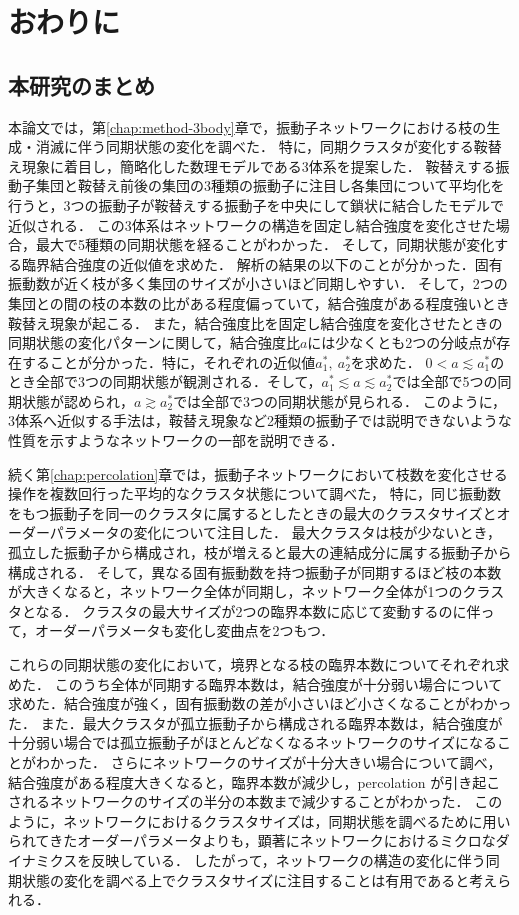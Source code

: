 \documentclass[../main]{subfiles}
\begin{document}
\chapter{おわりに}
\label{chap:summary}
\section{本研究のまとめ}
本論文では，第\ref{chap:method-3body}章で，振動子ネットワークにおける枝の生成・消滅に伴う同期状態の変化を調べた．
特に，同期クラスタが変化する鞍替え現象に着目し，簡略化した数理モデルである3体系を提案した．
鞍替えする振動子集団と鞍替え前後の集団の3種類の振動子に注目し各集団について平均化を行うと，3つの振動子が鞍替えする振動子を中央にして鎖状に結合したモデルで近似される．
この3体系はネットワークの構造を固定し結合強度を変化させた場合，最大で5種類の同期状態を経ることがわかった．
そして，同期状態が変化する臨界結合強度の近似値を求めた．
解析の結果の以下のことが分かった．固有振動数が近く枝が多く集団のサイズが小さいほど同期しやすい．
そして，2つの集団との間の枝の本数の比がある程度偏っていて，結合強度がある程度強いとき鞍替え現象が起こる．
また，結合強度比を固定し結合強度を変化させたときの同期状態の変化パターンに関して，結合強度比$a$には少なくとも2つの分岐点が存在することが分かった．特に，それぞれの近似値$a^\ast_1,\ a^\ast_2$を求めた．
$0<a\lesssim a^\ast_1$のとき全部で3つの同期状態が観測される．そして，$a^\ast_1\lesssim a\lesssim a^\ast_2$では全部で5つの同期状態が認められ，$a\gtrsim a^\ast_2$では全部で3つの同期状態が見られる．
このように，3体系へ近似する手法は，鞍替え現象など2種類の振動子では説明できないような性質を示すようなネットワークの一部を説明できる．

続く第\ref{chap:percolation}章では，振動子ネットワークにおいて枝数を変化させる操作を複数回行った平均的なクラスタ状態について調べた，
特に，同じ振動数をもつ振動子を同一のクラスタに属するとしたときの最大のクラスタサイズとオーダーパラメータの変化について注目した．
最大クラスタは枝が少ないとき，孤立した振動子から構成され，枝が増えると最大の連結成分に属する振動子から構成される．
そして，異なる固有振動数を持つ振動子が同期するほど枝の本数が大きくなると，ネットワーク全体が同期し，ネットワーク全体が1つのクラスタとなる．
クラスタの最大サイズが2つの臨界本数に応じて変動するのに伴って，オーダーパラメータも変化し変曲点を2つもつ．

これらの同期状態の変化において，境界となる枝の臨界本数についてそれぞれ求めた．
このうち全体が同期する臨界本数は，結合強度が十分弱い場合について求めた．結合強度が強く，固有振動数の差が小さいほど小さくなることがわかった．
また．最大クラスタが孤立振動子から構成される臨界本数は，結合強度が十分弱い場合では孤立振動子がほとんどなくなるネットワークのサイズになることがわかった．
さらにネットワークのサイズが十分大きい場合について調べ，結合強度がある程度大きくなると，臨界本数が減少し，percolation が引き起こされるネットワークのサイズの半分の本数まで減少することがわかった．
このように，ネットワークにおけるクラスタサイズは，同期状態を調べるために用いられてきたオーダーパラメータよりも，顕著にネットワークにおけるミクロなダイナミクスを反映している．
したがって，ネットワークの構造の変化に伴う同期状態の変化を調べる上でクラスタサイズに注目することは有用であると考えられる．
\end{document}
